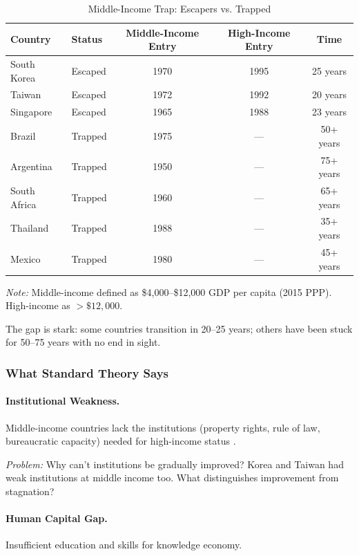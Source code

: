 \begin{table}[htbp]
\centering
\caption{Middle-Income Trap: Escapers vs. Trapped}
\label{tab:mit-examples}
\small
\begin{tabular}{@{}llccc@{}}
\toprule
\textbf{Country} & \textbf{Status} & \textbf{Middle-Income Entry} & \textbf{High-Income Entry} & \textbf{Time} \\
\midrule
South Korea & Escaped & 1970 & 1995 & 25 years \\
Taiwan & Escaped & 1972 & 1992 & 20 years \\
Singapore & Escaped & 1965 & 1988 & 23 years \\
\midrule
Brazil & Trapped & 1975 & --- & 50+ years \\
Argentina & Trapped & 1950 & --- & 75+ years \\
South Africa & Trapped & 1960 & --- & 65+ years \\
Thailand & Trapped & 1988 & --- & 35+ years \\
Mexico & Trapped & 1980 & --- & 45+ years \\
\bottomrule
\end{tabular}
\begin{flushleft}
\small\textit{Note:} Middle-income defined as \$4,000--\$12,000 GDP per capita (2015 PPP). High-income as $>\$12,000$.
\end{flushleft}
\end{table}

The gap is stark: some countries transition in 20--25 years; others have been 
stuck for 50--75 years with no end in sight.

\subsubsection{What Standard Theory Says}

\paragraph{Institutional Weakness.}
Middle-income countries lack the institutions (property rights, rule of law, 
bureaucratic capacity) needed for high-income status \citep{acemoglu2012whynations}.

\textit{Problem:} Why can't institutions be gradually improved? Korea and Taiwan 
had weak institutions at middle income too. What distinguishes improvement from stagnation?

\paragraph{Human Capital Gap.}
Insufficient education and skills for knowledge economy.

